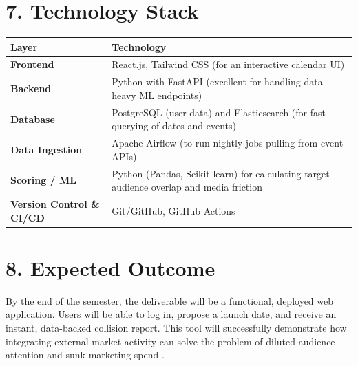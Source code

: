 \documentclass[12pt]{article}
\begin{document}
\section*{7. Technology Stack}
\noindent
\begin{tabularx}{\textwidth}{|l|X|}
\hline
\textbf{Layer} & \textbf{Technology} \\
\hline
\textbf{Frontend} & React.js, Tailwind CSS (for an interactive calendar UI) \\
\hline
\textbf{Backend} & Python with FastAPI (excellent for handling data-heavy ML endpoints) \\
\hline
\textbf{Database} & PostgreSQL (user data) and Elasticsearch (for fast querying of dates and events) \\
\hline
\textbf{Data Ingestion} & Apache Airflow (to run nightly jobs pulling from event APIs) \\
\hline
\textbf{Scoring / ML} & Python (Pandas, Scikit-learn) for calculating target audience overlap and media friction \\
\hline
\textbf{Version Control \& CI/CD} & Git/GitHub, GitHub Actions \\
\hline
\end{tabularx}

\section*{8. Expected Outcome}
By the end of the semester, the deliverable will be a functional, deployed web application. Users will be able to log in, propose a launch date, and receive an instant, data-backed collision report. This tool will successfully demonstrate how integrating external market activity can solve the problem of diluted audience attention and sunk marketing spend .
\end{document}
